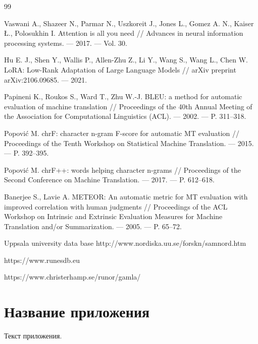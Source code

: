 \documentclass[14pt,a4paper]{extreport}
\begin{document}
\begin{thebibliography}{99}
Vaswani A., Shazeer N., Parmar N., Uszkoreit J., Jones L., Gomez A. N., Kaiser Ł., Polosukhin I. Attention is all you need // Advances in neural information processing systems. --- 2017. --- Vol. 30.

Hu E. J., Shen Y., Wallis P., Allen-Zhu Z., Li Y., Wang S., Wang L., Chen W. LoRA: Low-Rank Adaptation of Large Language Models // arXiv preprint arXiv:2106.09685. --- 2021.

Papineni K., Roukos S., Ward T., Zhu W.-J. BLEU: a method for automatic evaluation of machine translation // Proceedings of the 40th Annual Meeting of the Association for Computational Linguistics (ACL). --- 2002. --- P. 311--318.

Popović M. chrF: character n-gram F-score for automatic MT evaluation // Proceedings of the Tenth Workshop on Statistical Machine Translation. --- 2015. --- P. 392--395.

Popović M. chrF++: words helping character n-grams // Proceedings of the Second Conference on Machine Translation. --- 2017. --- P. 612--618.

Banerjee S., Lavie A. METEOR: An automatic metric for MT evaluation with improved correlation with human judgments // Proceedings of the ACL Workshop on Intrinsic and Extrinsic Evaluation Measures for Machine Translation and/or Summarization. --- 2005. --- P. 65--72.


Uppsala university data base http://www.nordiska.uu.se/forskn/samnord.htm

https://www.runesdb.eu

https://www.christerhamp.se/runor/gamla/

\end{thebibliography}
\chapter{Название приложения}
Текст приложения.
\end{document}
